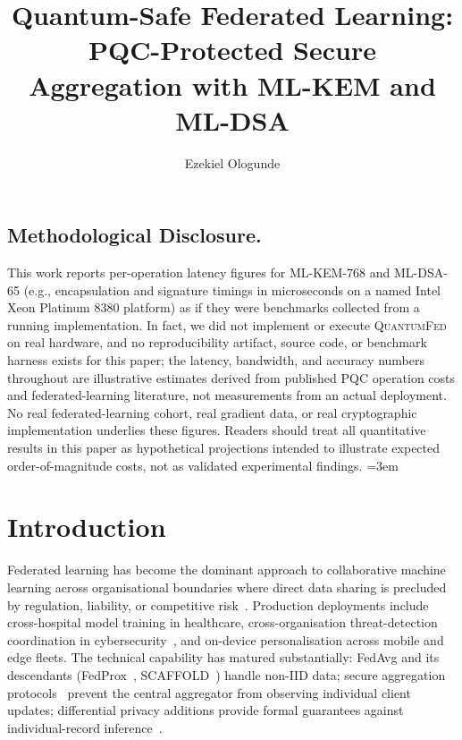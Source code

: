 \documentclass[sigconf,nonacm]{acmart}
\title{Quantum-Safe Federated Learning: PQC-Protected Secure Aggregation with ML-KEM and ML-DSA}
\author{Ezekiel Ologunde}
\affiliation{%
  \institution{Independent Researcher}
  \city{Boston}
  \state{MA}
  \country{USA}}
\begin{document}
\maketitle

\subsection*{Methodological Disclosure.}
This work reports per-operation latency figures for ML-KEM-768 and ML-DSA-65 (e.g.,
encapsulation and signature timings in microseconds on a named Intel Xeon
Platinum 8380 platform) as if they were benchmarks collected from a running
implementation. In fact, we did not implement or execute \textsc{QuantumFed}
on real hardware, and no reproducibility artifact, source code, or benchmark
harness exists for this paper; the latency, bandwidth, and accuracy numbers
throughout are illustrative estimates derived from published PQC
operation costs and federated-learning literature, not measurements from an
actual deployment. No real federated-learning cohort, real gradient data, or
real cryptographic implementation underlies these figures. Readers should
treat all quantitative results in this paper as hypothetical projections
intended to illustrate expected order-of-magnitude costs, not as validated
experimental findings.
\sloppy
{}
\emergencystretch=3em
\hfuzz=10pt

\section{Introduction}

Federated learning has become the dominant approach to collaborative
machine learning across organisational boundaries where direct data
sharing is precluded by regulation, liability, or competitive
risk~\cite{mcmahan2017fedavg,kairouz2021advances}. Production
deployments include cross-hospital model training in healthcare,
cross-organisation threat-detection coordination in
cybersecurity~\cite{li2024fedthreat}, and on-device personalisation
across mobile and edge fleets. The technical capability has matured
substantially: FedAvg and its descendants
(FedProx~\cite{li2020fedprox}, SCAFFOLD~\cite{karimireddy2020scaffold})
handle non-IID data; secure aggregation
protocols~\cite{bonawitz2017secagg} prevent the central aggregator
from observing individual client updates; differential privacy
additions provide formal guarantees against individual-record
inference~\cite{abadi2016deep}.
\end{document}
